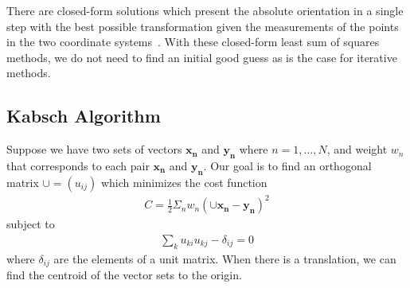 There are closed-form solutions which present the absolute orientation in a single step with the best possible transformation given the measurements of the points in the two coordinate systems~\cite{horn1987closed,Kabsch1978}. With these closed-form least sum of squares methods, we do not need to find an initial good guess as is the case for iterative methods.

\subsection{Kabsch Algorithm}
\label{sec:opt_rot::kabsch}
 
 Suppose we have two sets of vectors $\bm{x_n}$ and $\bm{y_n}$ where $n=1,\ldots, N$, and weight $w_n$ that corresponds to each pair $\bm{x_n}$ and $\bm{y_n}$. Our goal is to find an orthogonal matrix $\cup = (u_{ij})$ which minimizes the cost function
 \begin{align}
 	C = \frac{1}{2} \Sigma_n w_n \left(\cup \bm{x_n} - \bm{y_n}\right)^2 
 	\label{eq:kabsch_unconstraint}
 \end{align}
 subject to 
 \begin{align}
 	\sum_k u_{ki} u_{kj} - \delta_{ij} = 0
 	\label{eq:kabsch_constraint}
 \end{align}
 where $\delta_{ij}$ are the elements of a unit matrix. When there is a translation, we can find the centroid of the vector sets to the origin.
 

